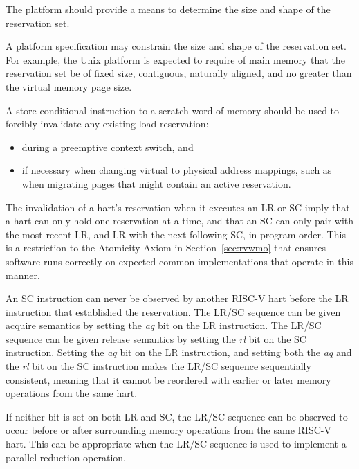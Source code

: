 \begin{commentary}
The platform should provide a means to determine the size and shape of the
reservation set.

A platform specification may constrain the size and shape of the reservation
set.
For example, the Unix platform is expected to require of main memory that the
reservation set be of fixed size, contiguous, naturally aligned, and no
greater than the virtual memory page size.
\end{commentary}

\begin{commentary}
A store-conditional instruction to a scratch word of memory should be used
to forcibly invalidate any existing load reservation:
\begin{itemize}
\item during a preemptive context switch, and
\item if necessary when changing virtual to physical address mappings,
  such as when migrating pages that might contain an active reservation.
\end{itemize}
\end{commentary}

\begin{commentary}
The invalidation of a hart's reservation when it executes an LR or SC
imply that a hart can only hold one reservation at a time, and that
an SC can only pair with the most recent LR, and LR with the next
following SC, in program order.  This is a restriction to the
Atomicity Axiom in Section~\ref{sec:rvwmo} that ensures software runs
correctly on expected common implementations that operate in this manner.
\end{commentary}

An SC instruction can never be observed by another RISC-V hart
before the LR instruction that established the reservation.
The LR/SC
sequence can be given acquire semantics by setting the {\em aq} bit on
the LR instruction.  The LR/SC sequence can be given release semantics
by setting the {\em rl} bit on the SC instruction.  Setting the {\em
  aq} bit on the LR instruction, and setting both the {\em aq} and the {\em
  rl} bit on the SC instruction makes the LR/SC sequence sequentially
consistent, meaning that it cannot be reordered with earlier or
later memory operations from the same hart.

If neither bit is set on both LR and SC, the LR/SC sequence can be
observed to occur before or after surrounding memory operations from
the same RISC-V hart.  This can be appropriate when the LR/SC
sequence is used to implement a parallel reduction operation.

